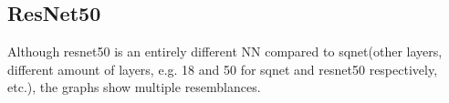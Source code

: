 \documentclass[../thesis.tex]{subfiles}
\begin{document}

\subsection{ResNet50}\label{subsection:resnet}
Although resnet50 is an entirely different NN compared to sqnet(other layers, different amount of layers, e.g. 18 and 50 for sqnet and resnet50 respectively, etc.), the graphs show multiple resemblances. 
\end{document}
